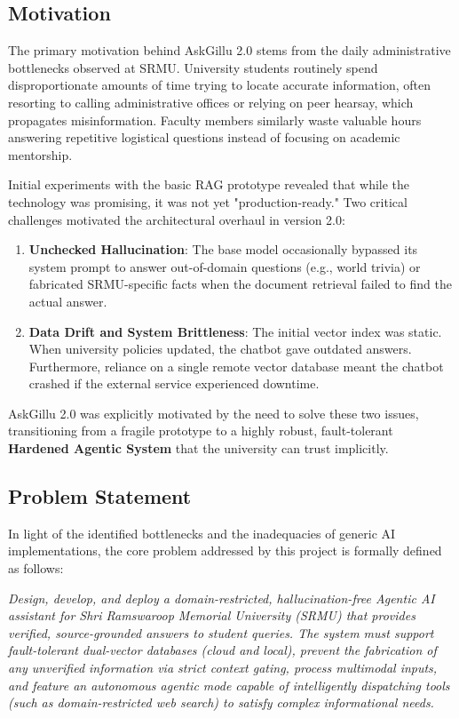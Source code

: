 \documentclass[12pt,a4paper]{report}
\begin{document}
\subsection{Motivation}
The primary motivation behind AskGillu 2.0 stems from the daily administrative bottlenecks observed at SRMU. University students routinely spend disproportionate amounts of time trying to locate accurate information, often resorting to calling administrative offices or relying on peer hearsay, which propagates misinformation. Faculty members similarly waste valuable hours answering repetitive logistical questions instead of focusing on academic mentorship.

Initial experiments with the basic RAG prototype revealed that while the technology was promising, it was not yet "production-ready." Two critical challenges motivated the architectural overhaul in version 2.0:
\begin{enumerate}
    \item \textbf{Unchecked Hallucination}: The base model occasionally bypassed its system prompt to answer out-of-domain questions (e.g., world trivia) or fabricated SRMU-specific facts when the document retrieval failed to find the actual answer.
    \item \textbf{Data Drift and System Brittleness}: The initial vector index was static. When university policies updated, the chatbot gave outdated answers. Furthermore, reliance on a single remote vector database meant the chatbot crashed if the external service experienced downtime.
\end{enumerate}

AskGillu 2.0 was explicitly motivated by the need to solve these two issues, transitioning from a fragile prototype to a highly robust, fault-tolerant \textbf{Hardened Agentic System} that the university can trust implicitly.

\subsection{Problem Statement}
In light of the identified bottlenecks and the inadequacies of generic AI implementations, the core problem addressed by this project is formally defined as follows:

\textit{Design, develop, and deploy a domain-restricted, hallucination-free Agentic AI assistant for Shri Ramswaroop Memorial University (SRMU) that provides verified, source-grounded answers to student queries. The system must support fault-tolerant dual-vector databases (cloud and local), prevent the fabrication of any unverified information via strict context gating, process multimodal inputs, and feature an autonomous agentic mode capable of intelligently dispatching tools (such as domain-restricted web search) to satisfy complex informational needs.}
\end{document}
